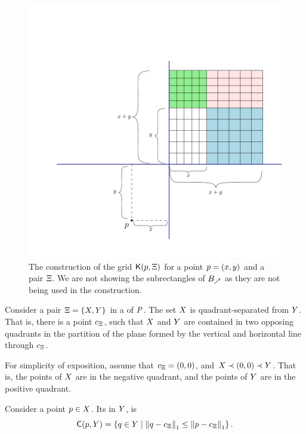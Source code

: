 \documentclass[12pt]{article}%
\begin{document}
\begin{figure}[t]
    \centering%
    \includegraphics{figs/grid_construction}%
    \caption{The construction of the grid $\mathsf{K}(p,\Xi)$ for a
       point $p=(x,y)$ and a pair $\Xi$. We are not showing the
       subrectangles of $B_\nearrow$ as they are not being used
       in the construction.  }
\end{figure}

Consider a pair $\Xi = \{X, Y \}$ in a \QSPD of $P$. The set
$X$ is quadrant-separated from $Y$. That is, there is a point
$c_\Xi$, such that $X$ and $Y$ are contained in two
opposing quadrants in the partition of the plane formed by the
vertical and horizontal line through $c_\Xi$.

For simplicity of exposition, assume that $c_\Xi = (0,0)$, and
$X \prec (0,0 ) \prec Y$. That is, the points of $X$ are in
the negative quadrant, and the points of $Y$ are in the positive
quadrant.

Consider a point $p \in X$. Its  in $Y$,
is
\begin{equation*}
    \clientsY{\pa}{\PSY}%
    =%
    \Set{ \pb \in \PSY }{ \dZ{1}{\pb}{\cen_\Pair}  \leq
       \dZ{1}{\pa}{\cen_\Pair}}.
\end{equation*}
\end{document}

